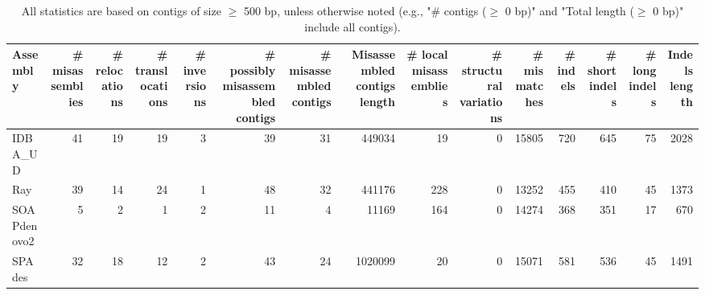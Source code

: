 \documentclass[12pt,a4paper]{article}
\begin{document}
\begin{table}[ht]
\begin{center}
\caption{All statistics are based on contigs of size $\geq$ 500 bp, unless otherwise noted (e.g., "\# contigs ($\geq$ 0 bp)" and "Total length ($\geq$ 0 bp)" include all contigs).}
\begin{tabular}{|l*{14}{|r}|}
\hline
Assembly & \# misassemblies &     \# relocations &     \# translocations &     \# inversions & \# possibly misassembled contigs & \# misassembled contigs & Misassembled contigs length & \# local misassemblies & \# structural variations & \# mismatches & \# indels &     \# short indels &     \# long indels & Indels length \\ \hline
IDBA\_UD & 41 & 19 & 19 & 3 & 39 & 31 & 449034 & 19 & 0 & 15805 & 720 & 645 & 75 & 2028 \\ \hline
Ray & 39 & 14 & 24 & 1 & 48 & 32 & 441176 & 228 & 0 & 13252 & 455 & 410 & 45 & 1373 \\ \hline
SOAPdenovo2 & 5 & 2 & 1 & 2 & 11 & 4 & 11169 & 164 & 0 & 14274 & 368 & 351 & 17 & 670 \\ \hline
SPAdes & 32 & 18 & 12 & 2 & 43 & 24 & 1020099 & 20 & 0 & 15071 & 581 & 536 & 45 & 1491 \\ \hline
\end{tabular}
\end{center}
\end{table}
\end{document}
